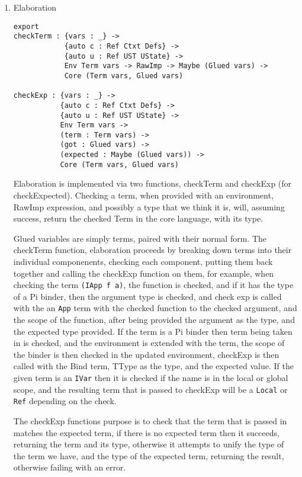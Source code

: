 \documentclass[a4paper]{article}
\begin{document}
\begin{enumerate}
\item Elaboration
\label{sec:org111fc87}
\begin{center}
\begin{verbatim}
export
checkTerm : {vars : _} ->
			{auto c : Ref Ctxt Defs} ->
			{auto u : Ref UST UState} ->
			Env Term vars -> RawImp -> Maybe (Glued vars) ->
			Core (Term vars, Glued vars)

checkExp : {vars : _} ->
		   {auto c : Ref Ctxt Defs} ->
		   {auto u : Ref UST UState} ->
		   Env Term vars ->
		   (term : Term vars) ->
		   (got : Glued vars) ->
		   (expected : Maybe (Glued vars)) ->
		   Core (Term vars, Glued vars)
\end{verbatim}
\end{center}


Elaboration is implemented via two functions, checkTerm and checkExp
(for checkExpected). Checking a term, when provided with an environment, 
RawImp expression, and possibly a type that we think it is, will, assuming 
success, return the checked Term in the core language, with its type. 

Glued variables are simply terms, paired with their normal form. The checkTerm 
function, elaboration proceeds by breaking down terms into their individual
componenents, checking each component, putting them back together and calling the 
checkExp function on them, for example, when checking the term \texttt{(IApp f a)}, 
the function is checked, and if it has the type of a Pi binder, then the 
argument type is checked, and check exp is called with the an \texttt{App} term with 
the checked function to the checked argument, and the scope of the function, 
after being provided the argument as the type, and the expected type provided.
If the term is a Pi binder then term being taken in is checked, and the 
environment is extended with the term, the scope of the binder is then
checked in the updated environment, checkExp is then called with the Bind 
term, TType as the type, and the expected value. If the given term is an \texttt{IVar} 
then it is checked if the name is in the local or global scope, and the resulting
term that is passed to checkExp will be a \texttt{Local} or \texttt{Ref} depending on the check.


The checkExp functions purpose is to check that the term that is passed in matches
the expected term, if there is no expected term then it succeeds, returning 
the term and its type, otherwise it attempts to unify the type of the term 
we have, and the type of the expected term, returning the result, otherwise
failing with an error. 


\end{enumerate}
\end{document}
